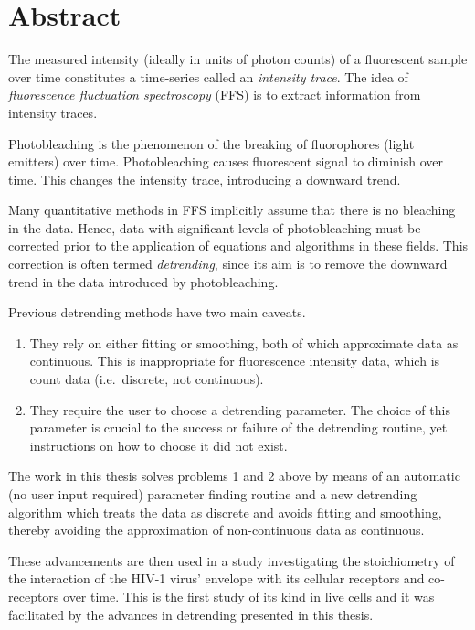 \documentclass[12pt,]{book}
\providecommand{\tightlist}{%
  \setlength{\itemsep}{0pt}\setlength{\parskip}{0pt}}
\theoremstyle{definition}
\theoremstyle{definition}
\theoremstyle{definition}
\theoremstyle{remark}
\begin{document}
\chapter*{Abstract}\label{abstract}

The measured intensity (ideally in units of photon counts) of a
fluorescent sample over time constitutes a time-series called an
\emph{intensity trace}. The idea of \emph{fluorescence fluctuation
spectroscopy} (FFS) is to extract information from intensity traces.

Photobleaching is the phenomenon of the breaking of fluorophores (light
emitters) over time. Photobleaching causes fluorescent signal to
diminish over time. This changes the intensity trace, introducing a
downward trend.

Many quantitative methods in FFS implicitly assume that there is no
bleaching in the data. Hence, data with significant levels of
photobleaching must be corrected prior to the application of equations
and algorithms in these fields. This correction is often termed
\emph{detrending}, since its aim is to remove the downward trend in the
data introduced by photobleaching.

Previous detrending methods have two main caveats.

\begin{enumerate}
\def\labelenumi{\arabic{enumi}.}
\tightlist
\item
  They rely on either fitting or smoothing, both of which approximate
  data as continuous. This is inappropriate for fluorescence intensity
  data, which is count data (i.e.~discrete, not continuous).
\item
  They require the user to choose a detrending parameter. The choice of
  this parameter is crucial to the success or failure of the detrending
  routine, yet instructions on how to choose it did not exist.
\end{enumerate}

The work in this thesis solves problems 1 and 2 above by means of an
automatic (no user input required) parameter finding routine and a new
detrending algorithm which treats the data as discrete and avoids
fitting and smoothing, thereby avoiding the approximation of
non-continuous data as continuous.

These advancements are then used in a study investigating the
stoichiometry of the interaction of the HIV-1 virus' envelope with its
cellular receptors and co-receptors over time. This is the first study
of its kind in live cells and it was facilitated by the advances in
detrending presented in this thesis.
\end{document}
